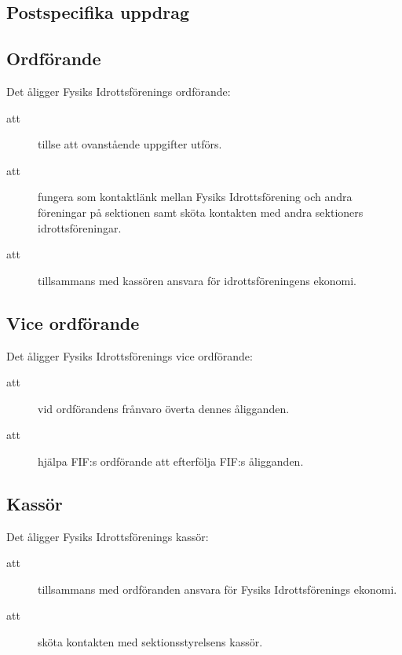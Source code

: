 \documentclass[a4paper]{article}
\begin{document}
\begin{foreningenv}{\forening{}}
    \section{Postspecifika uppdrag}
    \subsection{Ordförande}
    Det åligger Fysiks Idrottsförenings ordförande:
    \begin{description}
        \item[att] tillse att ovanstående uppgifter utförs.
        \item[att] fungera som kontaktlänk mellan Fysiks Idrottsförening och andra föreningar på sektionen samt sköta kontakten med andra sektioners idrottsföreningar.
        \item[att] tillsammans med kassören ansvara för idrottsföreningens ekonomi.
    \end{description}
    
    \subsection{Vice ordförande}
    Det åligger Fysiks Idrottsförenings vice ordförande:
    \begin{description}
        \item[att] vid ordförandens frånvaro överta dennes åligganden.
        \item[att] hjälpa FIF:s ordförande att efterfölja FIF:s åligganden.
    \end{description}
    
    \subsection{Kassör}
    Det åligger Fysiks Idrottsförenings kassör:
    \begin{description}
        \item[att] tillsammans med ordföranden ansvara för Fysiks Idrottsförenings ekonomi.
        \item[att] sköta kontakten med sektionsstyrelsens kassör.
    \end{description}
\end{foreningenv}
\end{document}
